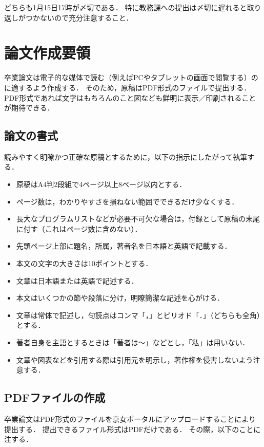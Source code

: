 \documentclass[a4paper,twocolumn,10pt]{ltjsarticle}
\begin{document}
どちらも1月15日17時が〆切である．
特に教務課への提出は〆切に遅れると取り返しがつかないので充分注意すること．

\section{論文作成要領}

卒業論文は電子的な媒体で読む（例えばPCやタブレットの画面で閲覧する）のに適するよう作成する．
そのため，原稿はPDF形式のファイルで提出する．
PDF形式であれば文字はもちろんのこと図なども鮮明に表示／印刷されることが期待できる．

\subsection{論文の書式}

読みやすく明瞭かつ正確な原稿とするために，以下の指示にしたがって執筆する．

\begin{itemize}
 \item 原稿はA4判2段組で4ページ以上8ページ以内とする．
 \item ページ数は，わかりやすさを損ねない範囲でできるだけ少なくする．
 \item 長大なプログラムリストなどが必要不可欠な場合は，付録として原稿の末尾に付す（これはページ数に含めない）．
 \item 先頭ページ上部に題名，所属，著者名を日本語と英語で記載する．
 \item 本文の文字の大きさは10ポイントとする．
 \item 文章は日本語または英語で記述する．
 \item 本文はいくつかの節や段落に分け，明瞭簡潔な記述を心がける．
 \item 文章は常体で記述し，句読点はコンマ「，」とピリオド「．」（どちらも全角）とする．
 \item 著者自身を主語とするときは「著者は〜」などとし，「私」は用いない．
 \item 文章や図表などを引用する際は引用元を明示し，著作権を侵害しないよう注意する．
\end{itemize}

\subsection{PDFファイルの作成}

卒業論文はPDF形式のファイルを京女ポータルにアップロードすることにより提出する．
提出できるファイル形式はPDFだけである．
その際，以下のことに注する．
\end{document}

